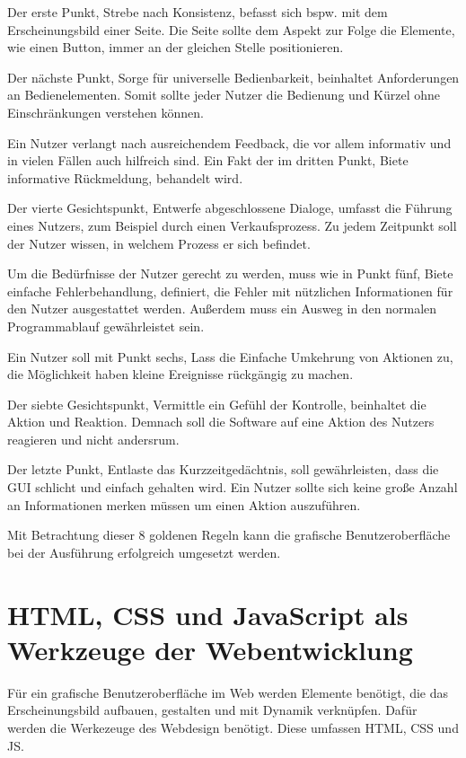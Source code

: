 \documentclass[a4paper,titlepage,halfparskip,12pt]{scrreprt}
\begin{document}
\begin{onehalfspacing}
Der erste Punkt, Strebe nach Konsistenz, befasst sich bspw. mit dem Erscheinungsbild einer Seite. Die Seite sollte dem Aspekt zur Folge die Elemente, wie einen Button, immer an der gleichen Stelle positionieren.

Der nächste Punkt, Sorge für universelle Bedienbarkeit, beinhaltet Anforderungen an Bedienelementen. Somit sollte jeder Nutzer die Bedienung und Kürzel ohne Einschränkungen verstehen können.

Ein Nutzer verlangt nach ausreichendem Feedback, die vor allem informativ und in vielen Fällen auch hilfreich sind. Ein Fakt der im dritten Punkt, Biete informative Rückmeldung, behandelt wird.

Der vierte Gesichtspunkt, Entwerfe abgeschlossene Dialoge, umfasst die Führung eines Nutzers, zum Beispiel durch einen Verkaufsprozess. Zu jedem Zeitpunkt soll der Nutzer wissen, in welchem Prozess er sich befindet.

Um die Bedürfnisse der Nutzer gerecht zu werden, muss wie in Punkt fünf, Biete einfache Fehlerbehandlung, definiert, die Fehler mit nützlichen Informationen für den Nutzer ausgestattet werden. Außerdem muss ein Ausweg in den normalen Programmablauf gewährleistet sein.

Ein Nutzer soll mit Punkt sechs, Lass die Einfache Umkehrung von Aktionen zu, die Möglichkeit haben kleine Ereignisse rückgängig zu machen.

Der siebte Gesichtspunkt, Vermittle ein Gefühl der Kontrolle, beinhaltet die Aktion und Reaktion. Demnach soll die Software auf eine Aktion des Nutzers reagieren und nicht andersrum. 

Der letzte Punkt, Entlaste das Kurzzeitgedächtnis, soll gewährleisten, dass die \ac{GUI} schlicht und einfach gehalten wird. Ein Nutzer sollte sich keine große Anzahl an Informationen merken müssen um einen Aktion auszuführen.
\cite{UI8Regeln2019}

Mit Betrachtung dieser 8 goldenen Regeln kann die grafische Benutzeroberfläche bei der Ausführung erfolgreich umgesetzt werden.


\section{HTML, CSS und JavaScript als Werkzeuge der Webentwicklung}
\label{sec:HTMLCSSJS}
Für ein grafische Benutzeroberfläche im Web werden Elemente benötigt, die das Erscheinungsbild aufbauen, gestalten und mit Dynamik verknüpfen. Dafür werden die Werkezeuge des Webdesign benötigt. Diese umfassen \ac{HTML}, \ac{CSS} und \ac{JS}.


\end{onehalfspacing}
\end{document}
